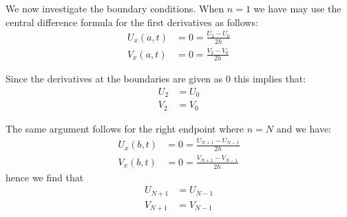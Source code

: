 We now investigate the boundary conditions. When $n=1$ we have may use the
central difference formula for the first derivatives as follows:
\begin{subequations}
\begin{align}
    U_x(a,t) &= 0 = \frac{{U_2} - U_{0}}{2h} \\
    V_x(a,t) &= 0 = \frac{{V_2} - V_{0}}{2h}
\end{align}
\end{subequations}

Since the derivatives at the boundaries are given as 0 this implies that:
\begin{subequations} \label{eq:left_end_points}
\begin{align}
    U_{2} &= U_{0} \\
    V_{2} &= V_{0}
\end{align}
\end{subequations}

The same argument follows for the right endpoint where $n=N$ and we have:
\begin{subequations}
\begin{align}
    U_x(b,t) &= 0 = \frac{{U_{N+1}} - U_{N-1}}{2h} \\
    V_x(b,t) &= 0 = \frac{{V_{N+1}} - V_{N-1}}{2h}
\end{align}
\end{subequations}
hence we find that
\begin{subequations} \label{eq:right_end_points}
\begin{align}
    U_{N+1} &= U_{N-1} \\
    V_{N+1} &= V_{N-1}
\end{align}
\end{subequations}

